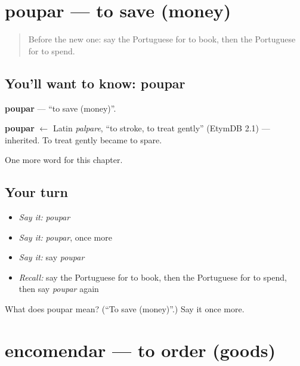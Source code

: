 \section[poupar]{poupar — to save (money)}

\label{lesson:PT-C201-poupar}



\begin{quote}
Before the new one: say the Portuguese for to book, then the Portuguese for to spend.
\end{quote}

\subsection*{You'll want to know: poupar}
\textbf{poupar} — \textquotedblleft{}to save (money)\textquotedblright{}.

\begin{cousinweb}
\textbf{poupar} $\leftarrow$ Latin \emph{palpare}, \textquotedblleft{}to stroke, to treat gently\textquotedblright{} (EtymDB 2.1) — inherited. To treat gently became to spare.
\end{cousinweb}

\begin{grammarlens}[title={What you've built}]
One more word for this chapter.
\end{grammarlens}

\subsection*{Your turn}
\begin{itemize}
\raggedright
  \item \emph{Say it:} \emph{poupar}
  \item \emph{Say it:} \emph{poupar}, once more
  \item \emph{Say it:} say \emph{poupar}
  \item \emph{Recall:} say the Portuguese for to book, then the Portuguese for to spend, then say \emph{poupar} again
\end{itemize}

\begin{tcolorbox}[breakable,colback=teal!4,colframe=teal!35!black,title={Before you move on}]
What does poupar mean? (\textquotedblleft{}To save (money)\textquotedblright{}.) Say it once more.
\end{tcolorbox}
\section[encomendar]{encomendar — to order (goods)}

